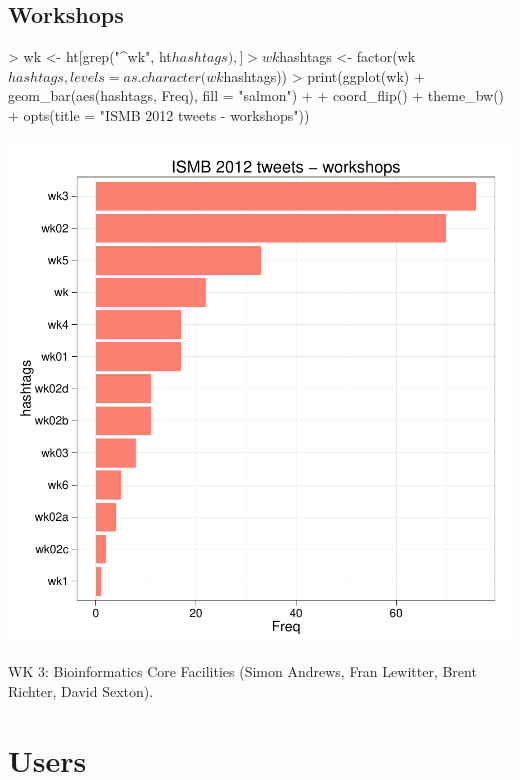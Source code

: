 \documentclass[a4paper,10pt]{article}
\begin{document}
\subsection{Workshops}
\begin{center}
\begin{Schunk}
\begin{Sinput}
> wk <- ht[grep("^wk", ht$hashtags),]
> wk$hashtags <- factor(wk$hashtags, levels = as.character(wk$hashtags))
> print(ggplot(wk) + geom_bar(aes(hashtags, Freq), fill = "salmon") + 
+   coord_flip() + theme_bw() + opts(title = "ISMB 2012 tweets - workshops"))
\end{Sinput}
\end{Schunk}
\includegraphics{ismb-009}
\end{center}

WK 3: Bioinformatics Core Facilities (Simon Andrews, Fran Lewitter, Brent Richter, David Sexton).

\newpage

\section{Users}
\end{document}

